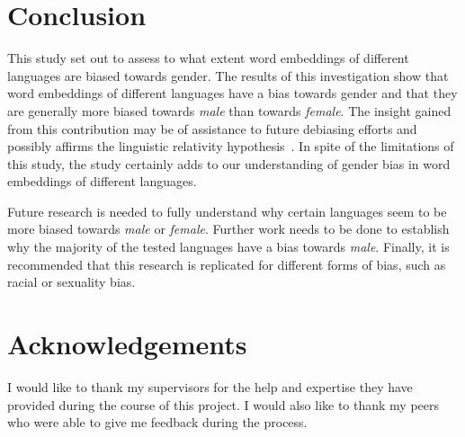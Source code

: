 \section{Conclusion}
This study set out to assess to what extent word embeddings of different
languages are biased towards gender. The results of this investigation show
that word embeddings of different languages have a bias towards gender and
that they are generally more biased towards \emph{male} than towards \emph{female}.
The insight gained from
this contribution may be of assistance to future debiasing efforts and possibly
affirms the linguistic relativity hypothesis~\parencite{lucy_linguistic_1997}.
In spite of the limitations of this study, the study certainly adds to our understanding
of gender bias in word embeddings of different languages.

Future research is needed to fully understand why certain languages seem to be
more biased towards \emph{male} or \emph{female}. Further work needs to be done to
establish why the majority of the tested languages have a bias towards \emph{male}.
Finally, it is recommended that this research is replicated for different forms
of bias, such as racial or sexuality bias.

\section{Acknowledgements}
I would like to thank my supervisors for the help and expertise they have provided
during the course of this project. I would also like to thank my peers who were able
to give me feedback during the process.

